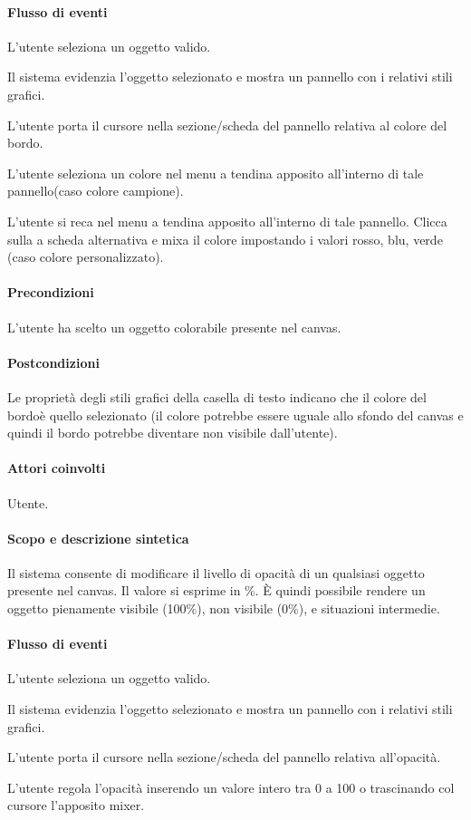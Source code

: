 \paragraph{Flusso di eventi}
\begin{elenconumerato}[\textbf{}]{\subsubsecindent}
\item L'utente seleziona un oggetto valido.
\item Il sistema evidenzia l'oggetto selezionato e mostra un pannello con i relativi stili grafici.
\item L'utente  porta  il cursore nella sezione/scheda del pannello relativa al colore del bordo.
\item L'utente seleziona un colore  nel menu a tendina apposito all'interno di tale pannello(caso colore campione).
\item L'utente si reca nel menu a tendina apposito all'interno di tale pannello. Clicca sulla a scheda alternativa e mixa il colore impostando i valori rosso, blu, verde (caso colore personalizzato).
\end{elenconumerato}
\paragraph{Precondizioni} L'utente ha scelto un oggetto colorabile presente nel canvas.
\paragraph{Postcondizioni} Le propriet\` a degli stili grafici della casella di testo indicano che il colore del bordo\` e quello selezionato (il colore potrebbe essere uguale allo sfondo del canvas e quindi il bordo potrebbe diventare non visibile dall'utente).


\paragraph{Attori coinvolti} Utente.
\paragraph{Scopo e descrizione sintetica}  Il sistema consente di modificare il livello di opacit\` a di un qualsiasi oggetto presente nel canvas. Il valore si esprime in \%.   \` E quindi possibile rendere un oggetto pienamente visibile (100\%), non visibile (0\%), e situazioni intermedie.
\paragraph{Flusso di eventi}
\begin{elenconumerato}[\textbf{}]{\subsubsecindent}
\item L'utente seleziona un oggetto valido.
\item Il sistema evidenzia l'oggetto selezionato e mostra un pannello con i relativi stili grafici.
\item  L'utente porta  il cursore nella sezione/scheda del pannello relativa all'opacit\` a.
\item  L'utente regola l'opacit\` a inserendo un valore intero tra 0 a 100 o trascinando col cursore l'apposito mixer.
\end{elenconumerato}
